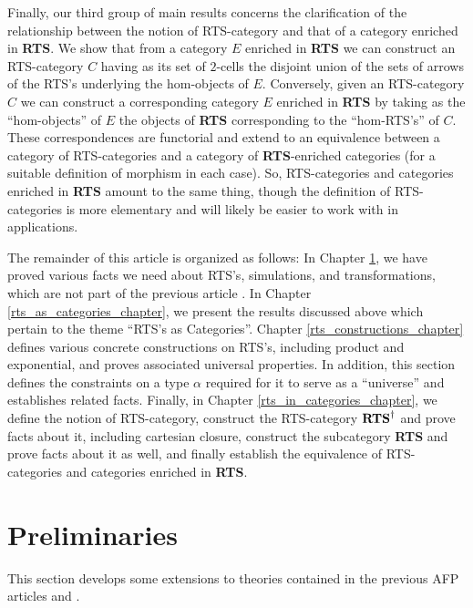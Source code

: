 \documentclass[11pt,notitlepage,a4paper]{report}
\begin{document}
Finally, our third group of main results concerns the clarification of the relationship
between the notion of RTS-category and that of a category enriched in {\bf RTS}.
We show that from a category $E$ enriched in {\bf RTS} we
can construct an RTS-category $C$ having as its set of $2$-cells the disjoint union of
the sets of arrows of the RTS's underlying the hom-objects of $E$.  Conversely, given an
RTS-category $C$ we can construct a corresponding category $E$ enriched in {\bf RTS}
by taking as the ``hom-objects'' of $E$ the objects of {\bf RTS} corresponding to the
``hom-RTS's'' of $C$.
These correspondences are functorial and extend to an equivalence between a category
of RTS-categories and a category of {\bf RTS}-enriched categories (for a suitable
definition of morphism in each case).  So, RTS-categories and categories enriched in
{\bf RTS} amount to the same thing, though the definition of RTS-categories is more elementary
and will likely be easier to work with in applications.

The remainder of this article is organized as follows:
In Chapter \ref{preliminaries_chapter}, we have proved various facts we need about RTS's,
simulations, and transformations, which are not part of the previous article
\cite{ResiduatedTransitionSystem-AFP}.
In Chapter \ref{rts_as_categories_chapter}, we present the results discussed above
which pertain to the theme ``RTS's as Categories''.
Chapter \ref{rts_constructions_chapter} defines various concrete constructions on RTS's,
including product and exponential, and proves associated universal properties.
In addition, this section defines the constraints on a type $\alpha$ required for it
to serve as a ``universe'' and establishes related facts.
Finally, in Chapter \ref{rts_in_categories_chapter}, we define the notion of
RTS-category, construct the RTS-category ${\bf RTS}^\dag$ and prove facts about it,
including cartesian closure, construct the subcategory {\bf RTS} and prove facts about
it as well, and finally establish the equivalence of RTS-categories and categories
enriched in {\bf RTS}.

\chapter{Preliminaries}
\label{preliminaries_chapter}

This section develops some extensions to theories contained in the previous AFP
articles \cite{ResiduatedTransitionSystem-AFP} and \cite{MonoidalCategory-AFP}.

  
\end{document}
